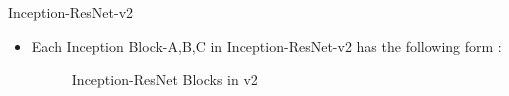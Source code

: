 \documentclass{beamer}
\begin{document}
\begin{frame}{Inception-ResNet-v2}
	\begin{itemize}
		\item Each Inception Block-A,B,C in Inception-ResNet-v2 has the following form :
		\vspace{10pt}
		\begin{figure}[h]		
			\centering
			\quad
			\quad
			\caption{Inception-ResNet Blocks in v2}
			\label{Inception-ResNet Blocks v2}
		\end{figure}
	\end{itemize}
\end{frame}
\end{document}
